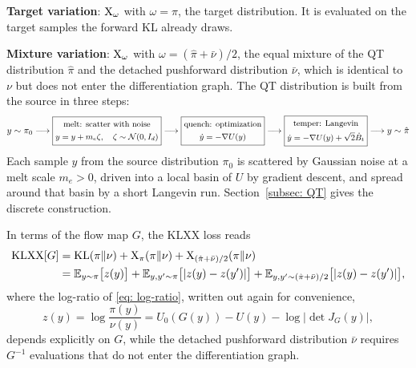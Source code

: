 \documentclass{article}
\begin{document}
\textbf{Target variation}: $\mathrm{X}_\omega$ with $\omega = \pi$, the target distribution. It is evaluated on the target samples the forward KL already draws.

\textbf{Mixture variation}: $\mathrm{X}_\omega$ with $\omega = (\hat\pi + \bar\nu)/2$, the equal mixture of the QT distribution $\hat\pi$ and the detached pushforward distribution $\bar\nu$, which is identical to $\nu$ but does not enter the differentiation graph. The QT distribution is built from the source in three steps:
	\begin{equation*}
		y\sim \pi_0 \longrightarrow \boxed{\small
		\begin{gathered}
			\text{melt: scatter with noise} \\
			y = y + m_e \zeta, \quad \zeta \sim \mathcal N(0,I_d)
		\end{gathered}
		} \longrightarrow \boxed{\small
		\begin{gathered}
			\text{quench: optimization} \\
			\dot y = -\nabla U(y)
		\end{gathered}
		} \longrightarrow \boxed{\small
		\begin{gathered}
			\text{temper: Langevin} \\
			\dot y = -\nabla U(y) + \sqrt{2}\dot B_t
		\end{gathered}
		} \longrightarrow y\sim \hat \pi
	\end{equation*}
Each sample $y$ from the source distribution $\pi_0$ is scattered by Gaussian noise at a melt scale $m_e>0$, driven into a local basin of $U$ by gradient descent, and spread around that basin by a short Langevin run. Section~\ref{subsec: QT} gives the discrete construction.

In terms of the flow map $G$, the KLXX loss reads
\begin{align}
	\mathrm{KLXX}[G] & = \mathrm{KL}(\pi\|\nu) + \mathrm{X}_\pi(\pi\|\nu) + \mathrm{X}_{(\hat\pi+\bar\nu)/2}(\pi\|\nu) \notag \\
	& = \mathbb E_{y\sim\pi}\big[z(y)\big] + \mathbb E_{y,y'\sim\pi}\big[|z(y)-z(y')|\big] + \mathbb E_{y,y'\sim(\hat\pi+\bar\nu)/2}\big[|z(y)-z(y')|\big],
	\label{eq: KLXX-G}
\end{align}
where the log-ratio of \eqref{eq: log-ratio}, written out again for convenience,
\begin{equation*}
	z(y) = \log\frac{\pi(y)}{\nu(y)} = U_0(G(y)) - U(y) - \log|\det J_G(y)| ,
\end{equation*}
depends explicitly on $G$, while the detached pushforward distribution $\bar\nu$ requires $G^{-1}$ evaluations that do not enter the differentiation graph.
\end{document}
